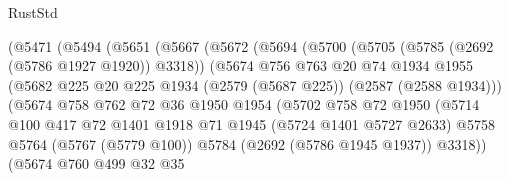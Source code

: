 \begin{lexlean}{RustStd}
\begin{coremodule}
{\begin{coremodule}
{{{{{{{{{{                        (@5471
                          (@5494
                            (@5651
                              (@5667
                                (@5672
                                  (@5694
                                    (@5700
                                      (@5705 (@5785 (@2692 (@5786 @1927 @1920)) @3318))
                                      (@5674
                                        @756
                                        @763
                                        @20
                                        @74
                                        @1934
                                        @1955
                                        (@5682
                                          @225
                                          @20
                                          @225
                                          @1934
                                          (@2579 (@5687 @225))
                                          (@2587 (@2588 @1934)))
                                        (@5674
                                          @758
                                          @762
                                          @72
                                          @36
                                          @1950
                                          @1954
                                          (@5702
                                            @758
                                            @72
                                            @1950
                                            (@5714
                                              @100
                                              @417
                                              @72
                                              @1401
                                              @1918
                                              @71
                                              @1945
                                              (@5724 @1401 @5727 @2633)
                                              @5758
                                              @5764
                                              (@5767 (@5779 @100))
                                              @5784
                                              (@2692 (@5786 @1945 @1937))
                                              @3318))
                                          (@5674
                                            @760
                                            @499
                                            @32
                                            @35
}}}}}}}}}}
\end{coremodule}}
\end{coremodule}
\end{lexlean}
